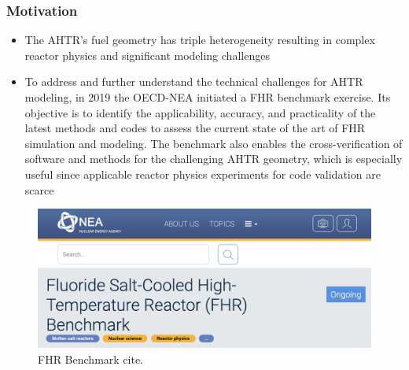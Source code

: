 \begin{frame}
  \frametitle{Motivation}
  \begin{itemize}
    \item The AHTR's fuel geometry has triple heterogeneity resulting in
    complex reactor physics and significant modeling challenges
    \item To address and further understand the technical challenges for 
    AHTR modeling, in 2019 the OECD-NEA initiated a FHR benchmark exercise. Its objective 
    is to identify the applicability, accuracy, and practicality of the latest 
    methods and codes to assess the current state of the art of FHR simulation 
    and modeling. The benchmark also enables the cross-verification of software 
    and methods for the challenging AHTR geometry, which is especially useful 
    since applicable reactor physics experiments for code validation are scarce
  \end{itemize}
  \begin{figure}[]
    \includegraphics[width=0.7\linewidth]{figures/benchmark.png} 
    \caption{FHR Benchmark cite.}
\end{figure}
\end{frame}
